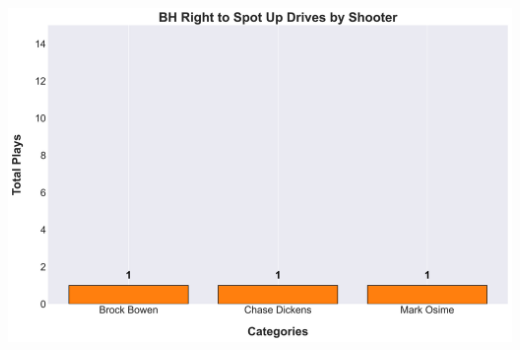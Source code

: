 \documentclass[a4paper,12pt]{article}
\begin{document}
\begin{table}[H]
{\begin{minipage}[t]{0.6\textwidth}
{\begin{tabular}
                
            
                
            
                
            
                
            
                
            
                
            
                
            
                
            
                
            
                
            
                
            
                
            
                
            
                
            
                
            

            \bottomrule
        \end{tabular}
        } %
    \end{minipage}
    } %
    \hfill %
    \begin{minipage}[c]{0.35\textwidth} %
        \flushright
        \includegraphics[width=\textwidth, height=.14\textheight]{images/PNR_PassRightDrivesPlayer_Freq.png} %
    \end{minipage}
\end{table}
\end{document}
